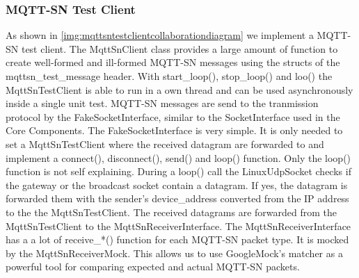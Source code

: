 \subsubsection{MQTT-SN Test Client}
As shown in  \autoref{img:mqttsntestclientcollaborationdiagram} we implement a MQTT-SN test client. 
The MqttSnClient class provides a large amount of function to create well-formed and ill-formed MQTT-SN messages using the structs of the mqttsn\_test\_message header.
With start\_loop(), stop\_loop() and loo() the MqttSnTestClient is able to run in a own thread and can be used asynchronously inside a single unit test.
MQTT-SN messages are send to the tranmission protocol by the FakeSocketInterface, similar to the SocketInterface used in the Core Components.
The FakeSocketInterface is very simple.
It is only needed to set a MqttSnTestClient where the received datagram are forwarded to and implement a connect(), disconnect(), send() and loop() function.
Only the loop() function is not self explaining. 
During a loop() call the LinuxUdpSocket checks if the gateway or the broadcast socket contain a datagram.
If yes, the datagram is forwarded them with the sender's device\_address converted from the IP address to the the MqttSnTestClient.
The received datagrams are forwarded from the MqttSnTestClient to the MqttSnReceiverInterface.
The MqttSnReceiverInterface has a a lot of receive\_*() function for each MQTT-SN packet type.
It is mocked by the MqttSnReceiverMock.
This allows us to use GoogleMock's matcher as a powerful tool for comparing expected and actual MQTT-SN packets.
